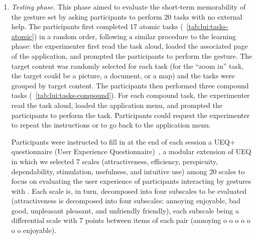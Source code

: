 \begin{enumerate}
    \item \textit{Testing phase.} This phase aimed to evaluate the short-term memorability of the gesture set by asking participants to perform 20 tasks with no external help. The participants first completed 17 atomic tasks (\tab~\ref{tab:lui:tasks-atomic}) in a random order, following a similar procedure to the learning phase: the experimenter first read the task aloud, loaded the associated page of the \lui application, and prompted the participants to perform the gesture. The target content was randomly selected for each task (\eg for the ``zoom in'' task, the target could be a picture, a document, or a map) and the tasks were grouped by target content.
    The participants then performed three compound tasks (\tab~\ref{tab:lui:tasks-compound}). For each compound task, the experimenter read the task aloud, loaded the application menu, and prompted the participants to perform the task. Participants could request the experimenter to repeat the instructions or to go back to the application menu.

    Participants were instructed to fill in at the end of each session a UEQ+ questionnaire (User Experience Questionnaire)~\cite{Schrepp:2017}, a modular extension of UEQ in which we selected 7 scales (\ie attractiveness, efficiency, perspicuity, dependability, stimulation, usefulness, and intuitive use) among 20 scales to focus on evaluating the user experience of participants interacting by gestures with \lui. Each scale is, in turn, decomposed into four subscales to be evaluated (\eg attractiveness is decomposed into four subscales: annoying \vs enjoyable, bad \vs good, unpleasant \vs pleasant, and unfriendly \vs friendly), each subscale being a differential scale with 7 points between items of each pair (\eg annoying o o o o o o o enjoyable). 


\end{enumerate}
